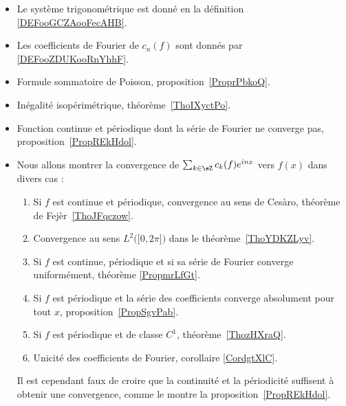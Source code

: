 
       \label{THMooHWEBooTMInve}
\begin{itemize}
    \item Le système trigonométrique est donné en la définition \ref{DEFooGCZAooFecAHB}.
    \item Les coefficients de Fourier de \( c_n(f)\) sont donnés par \ref{DEFooZDUKooRnYhhF}.
    \item Formule sommatoire de Poisson, proposition~\ref{ProprPbkoQ}.
    \item Inégalité isopérimétrique, théorème~\ref{ThoIXyctPo}.
    \item Fonction continue et périodique dont la série de Fourier ne converge pas, proposition~\ref{PropREkHdol}.

    \item
Nous allons montrer la convergence de \( \sum_{k\in \eZ}c_k(f) e^{inx}\) vers \( f(x)\) dans divers cas :
\begin{enumerate}
    \item
        Si \( f\) est continue et périodique, convergence au sens de Cesàro, théorème de Fejèr~\ref{ThoJFqczow}.
    \item
        Convergence au sens \( L^2\Big( \mathopen[ 0 , 2\pi \mathclose] \Big)\) dans le théorème~\ref{ThoYDKZLyv}.
    \item
        Si \( f\) est continue, périodique et si sa série de Fourier converge uniformément, théorème \ref{PropmrLfGt}.
    \item
        Si \( f\) est périodique et la série des coefficients converge absolument pour tout \( x\), proposition~\ref{PropSgvPab}.
    \item
        Si \( f\) est périodique et de classe \( C^1\), théorème~\ref{ThozHXraQ}.
    \item
        Unicité des coefficients de Fourier, corollaire \ref{CordgtXlC}.
\end{enumerate}
Il est cependant faux de croire que la continuité et la périodicité suffisent à obtenir une convergence, comme le montre la proposition~\ref{PropREkHdol}.
\end{itemize}
